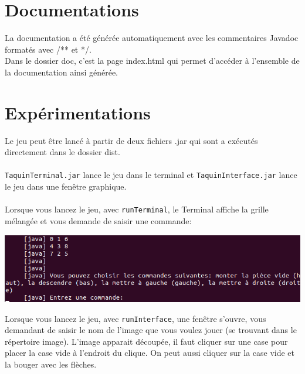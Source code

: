 \documentclass[french,12pt]{article}
\begin{document}
\section{Documentations}

La documentation a été générée automatiquement avec les commentaires Javadoc formatés avec /** et */.\\
Dans le dossier \textsf{doc}, c'est la page index.html qui permet d'accéder à l'ensemble de la documentation ainsi générée.

\section{Expérimentations}

Le jeu peut être lancé à partir de deux fichiers .jar qui sont a exécutés directement dans le dossier \textsf{dist}.
\\\\
\texttt{TaquinTerminal.jar} lance le jeu dans le terminal et \texttt{TaquinInterface.jar} lance le jeu dans une fenêtre graphique.
\\\\
Lorsque vous lancez le jeu, avec \texttt{runTerminal}, le Terminal affiche la grille mélangée et vous demande de saisir une commande:

\begin{center}
	\includegraphics[scale=0.3]{img/terminal.png}
\end{center}

Lorsque vous lancez le jeu, avec \texttt{runInterface}, une fenêtre s'ouvre, vous demandant de saisir le nom de l'image que vous voulez jouer (se trouvant dans le répertoire image). L'image apparait découpée, il faut cliquer sur une case pour placer la case vide à l'endroit du clique. On peut aussi cliquer sur la case vide et la bouger avec les flèches.
\end{document}
